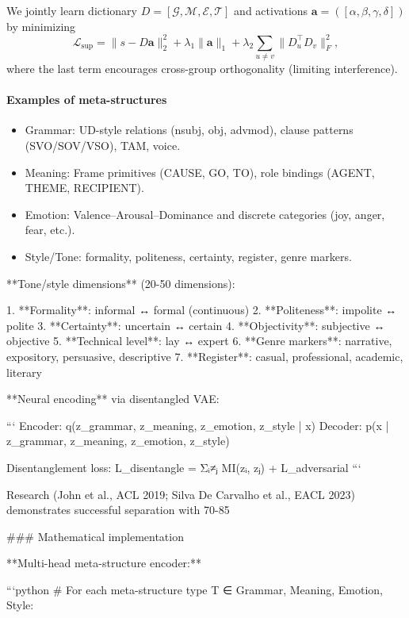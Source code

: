 \documentclass[11pt]{article}
\begin{document}
We jointly learn dictionary $D{=}[\mathcal{G},\mathcal{M},\mathcal{E},\mathcal{T}]$ and activations $\bm{a}{=}([\alpha,\beta,\gamma,\delta])$ by minimizing
\begin{equation}
\mathcal{L}_{\text{sup}}=\| s - D\bm{a} \|_2^2 + \lambda_1\|\bm{a}\|_1 + \lambda_2\sum_{u\ne v}\|D_u^\top D_v\|_F^2,
\end{equation}
where the last term encourages cross-group orthogonality (limiting interference).

\paragraph{Examples of meta-structures}
\begin{itemize}[noitemsep,topsep=2pt]
  \item Grammar: UD-style relations (nsubj, obj, advmod), clause patterns (SVO/SOV/VSO), TAM, voice.
  \item Meaning: Frame primitives (CAUSE, GO, TO), role bindings (AGENT, THEME, RECIPIENT).
  \item Emotion: Valence–Arousal–Dominance and discrete categories (joy, anger, fear, etc.).
  \item Style/Tone: formality, politeness, certainty, register, genre markers.
\end{itemize}

**Tone/style dimensions** (20-50 dimensions):

1. **Formality**: informal ↔ formal (continuous)
2. **Politeness**: impolite ↔ polite
3. **Certainty**: uncertain ↔ certain
4. **Objectivity**: subjective ↔ objective
5. **Technical level**: lay ↔ expert
6. **Genre markers**: narrative, expository, persuasive, descriptive
7. **Register**: casual, professional, academic, literary

**Neural encoding** via disentangled VAE:

```
Encoder: q(z_grammar, z_meaning, z_emotion, z_style | x)
Decoder: p(x | z_grammar, z_meaning, z_emotion, z_style)

Disentanglement loss:
L_disentangle = Σᵢ≠ⱼ MI(zᵢ, zⱼ) + L_adversarial
```

Research (John et al., ACL 2019; Silva De Carvalho et al., EACL 2023) demonstrates successful separation with 70-85%

### Mathematical implementation

**Multi-head meta-structure encoder:**

```python
# For each meta-structure type T ∈ {Grammar, Meaning, Emotion, Style}:
\end{document}
